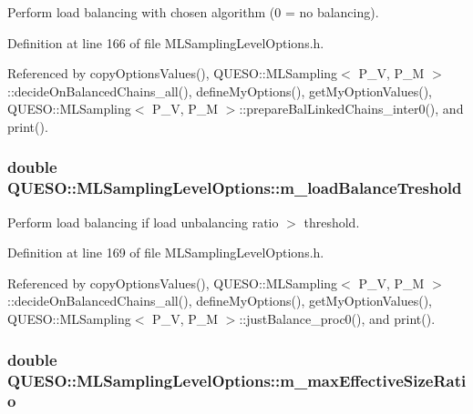 Perform load balancing with chosen algorithm (0 = no balancing). 



Definition at line 166 of file M\-L\-Sampling\-Level\-Options.\-h.



Referenced by copy\-Options\-Values(), Q\-U\-E\-S\-O\-::\-M\-L\-Sampling$<$ P\-\_\-\-V, P\-\_\-\-M $>$\-::decide\-On\-Balanced\-Chains\-\_\-all(), define\-My\-Options(), get\-My\-Option\-Values(), Q\-U\-E\-S\-O\-::\-M\-L\-Sampling$<$ P\-\_\-\-V, P\-\_\-\-M $>$\-::prepare\-Bal\-Linked\-Chains\-\_\-inter0(), and print().

\hypertarget{class_q_u_e_s_o_1_1_m_l_sampling_level_options_a1cef7bbef6c1017714281e8e464367d6}{
\subsubsection[{m\-\_\-load\-Balance\-Treshold}]{\setlength{\rightskip}{0pt plus 5cm}double Q\-U\-E\-S\-O\-::\-M\-L\-Sampling\-Level\-Options\-::m\-\_\-load\-Balance\-Treshold}}\label{class_q_u_e_s_o_1_1_m_l_sampling_level_options_a1cef7bbef6c1017714281e8e464367d6}


Perform load balancing if load unbalancing ratio $>$ threshold. 



Definition at line 169 of file M\-L\-Sampling\-Level\-Options.\-h.



Referenced by copy\-Options\-Values(), Q\-U\-E\-S\-O\-::\-M\-L\-Sampling$<$ P\-\_\-\-V, P\-\_\-\-M $>$\-::decide\-On\-Balanced\-Chains\-\_\-all(), define\-My\-Options(), get\-My\-Option\-Values(), Q\-U\-E\-S\-O\-::\-M\-L\-Sampling$<$ P\-\_\-\-V, P\-\_\-\-M $>$\-::just\-Balance\-\_\-proc0(), and print().

\hypertarget{class_q_u_e_s_o_1_1_m_l_sampling_level_options_a6740534c2a37694cbc3775dbf60619a1}{
\subsubsection[{m\-\_\-max\-Effective\-Size\-Ratio}]{\setlength{\rightskip}{0pt plus 5cm}double Q\-U\-E\-S\-O\-::\-M\-L\-Sampling\-Level\-Options\-::m\-\_\-max\-Effective\-Size\-Ratio}}\label{class_q_u_e_s_o_1_1_m_l_sampling_level_options_a6740534c2a37694cbc3775dbf60619a1}


